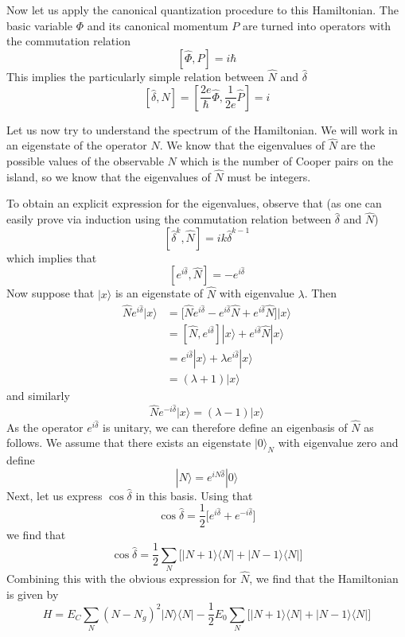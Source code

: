 \documentclass[a4paper, draft]{article}
\theoremstyle{own}
\theoremstyle{remark}
\begin{document}
Now let us apply the canonical quantization procedure to this Hamiltonian. The basic variable $\Phi$ and its canonical momentum $P$ are turned into operators with the commutation relation
$$
[\hat{\Phi}, \hat{P} ] = i \hbar
$$
This implies the particularly simple relation between $\hat{N}$ and $\hat{\delta}$
$$
[\hat{\delta}, \hat{N}] = [\frac{2e}{\hbar}  \hat{\Phi}, \frac{1}{2e}\hat{P}] = i
$$

Let us now try to understand the spectrum of the Hamiltonian. We will work in an eigenstate of the operator $\hat{N}$. We know that the eigenvalues of $\hat{N}$ are the possible values of the observable $N$ which is the number of Cooper pairs on the island, so we know that the eigenvalues of $\hat{N}$ must be integers. 

To obtain an explicit expression for the eigenvalues, observe that (as one can easily prove via induction using the commutation relation between $\hat{\delta}$ and $\hat{N}$)
$$
[\hat{\delta}^k, \hat{N}] = i k  \hat{\delta}^{k-1}
$$
which implies that
$$
[e^{i\hat{\delta}}, \hat{N}] = - e^{i\hat{\delta}}
$$
Now suppose that $|x \rangle$ is an eigenstate of $\hat{N}$ with eigenvalue $\lambda$. Then
\begin{align*}
\hat{N} e^{i\hat{\delta}} |x \rangle 
&= 
\big[ \hat{N} e^{i\hat{\delta}} -  e^{i\hat{\delta}} \hat{N} + 
e^{i\hat{\delta}} \hat{N} \big] |x \rangle \\
&= [\hat{N}, e^{i\hat{\delta}}] |x \rangle + e^{i\hat{\delta}} \hat{N} |x \rangle \\
&= e^{i\hat{\delta}} |x \rangle + \lambda e^{i\hat{\delta}} |x \rangle \\
&= (\lambda + 1) |x \rangle
\end{align*}
and similarly 
$$
\hat{N} e^{-i\hat{\delta}} |x \rangle  = (\lambda - 1) |x \rangle
$$
As the operator $e^{i\hat{\delta}}$ is unitary, we can therefore define an eigenbasis of $\hat{N}$ as follows. We assume that there exists an eigenstate $|0 \rangle_N$ with eigenvalue zero and define
$$
|N \rangle = e^{iN\hat{\delta}} |0 \rangle
$$
Next, let us express $\cos \hat{\delta}$ in this basis. Using that
$$
\cos \hat{\delta} = \frac{1}{2} \big[ e^{i\hat{\delta}} + e^{-i \hat{\delta}} \big]
$$
we find that
$$
\cos \hat{\delta} = \frac{1}{2} \sum_N
\big[
|N+1\rangle \langle N| +  |N-1\rangle \langle N|
\big]
$$
Combining this with the obvious expression for $\hat{N}$, we find that the Hamiltonian is given by
$$
H = E_C \sum_N (N-N_g)^2 |N \rangle \langle N |
- 
\frac{1}{2}E_0 \sum_N
\big[
|N+1\rangle \langle N| +  |N-1\rangle \langle N|
\big]
$$
 
\end{document}
